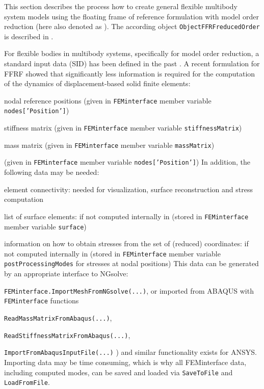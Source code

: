 \newpage
{}

This section describes the process how to create general flexible multibody system models using the floating frame of reference formulation with model order reduction (here also denoted as ). The according object \texttt{ObjectFFRFreducedOrder} is described in .

%
For flexible bodies in multibody systems, specifically for model order reduction, a standard input data (SID) has been defined in the past \cite{Schwertassek1999}.
A recent formulation for \ac{FFRF} \cite{ZwoelferGerstmayr2021} showed that significantly less information is required for the computation of the dynamics of displacement-based solid finite elements:
\bi
  \item nodal reference positions (given in \texttt{FEMinterface} member variable \texttt{nodes['Position']})
  \item stiffness matrix (given in \texttt{FEMinterface} member variable \texttt{stiffnessMatrix})
  \item mass matrix (given in \texttt{FEMinterface} member variable \texttt{massMatrix})
  \item (given in \texttt{FEMinterface} member variable \texttt{nodes['Position']})
\ei
In addition, the following data may be needed:
\bi
  \item element connectivity: needed for visualization, surface reconstruction and stress computation
  \item list of surface elements: if not computed internally in \codeName (stored in \texttt{FEMinterface} member variable \texttt{surface})
  \item information on how to obtain stresses from the set of (reduced) coordinates:  if not computed internally in \codeName (stored in \texttt{FEMinterface} member variable \texttt{postProcessingModes} for stresses at nodal positions)
\ei
This data can be generated by an appropriate interface to NGsolve:
\bi
  \item \texttt{FEMinterface.ImportMeshFromNGsolve(...)},
\ei
or imported from ABAQUS with \texttt{FEMinterface} functions
\bi
  \item \texttt{ReadMassMatrixFromAbaqus(...)}, 
  \item \texttt{ReadStiffnessMatrixFromAbaqus(...)}, 
  \item \texttt{ImportFromAbaqusInputFile(...)} )
\ei
and similar functionality exists for ANSYS.
Importing data may be time consuming, which is why all FEMinterface data, including computed modes, can be saved and loaded via
\texttt{SaveToFile} and \texttt{LoadFromFile}. 

